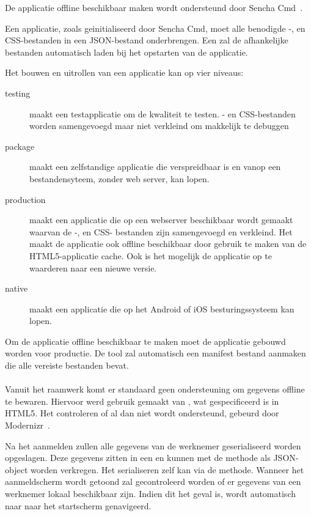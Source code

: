 De applicatie offline beschikbaar maken wordt ondersteund door Sencha Cmd~\cite{Sencha2012}.

Een applicatie,  zoals geinitialiseerd door Sencha Cmd,  moet alle benodigde \js-, en CSS-bestanden in een JSON-bestand onderbrengen.
Een  zal de afhankelijke bestanden automatisch laden bij het opstarten van de applicatie.

Het bouwen en uitrollen van een applicatie kan op vier niveaus:
\begin{description}
  \item [testing] maakt een testapplicatie om de kwaliteit te testen.  \js- en CSS-bestanden worden samengevoegd maar niet verkleind om makkelijk te debuggen
  \item [package] maakt een zelfstandige applicatie die verspreidbaar is en vanop een bestandensyteem,  zonder web server,  kan lopen.
  \item [production] maakt een applicatie die op een webserver beschikbaar wordt gemaakt waarvan de \js-, en CSS- bestanden zijn samengevoegd en verkleind.  Het maakt de applicatie ook offline beschikbaar door gebruik te maken van de HTML5-applicatie cache.  Ook is het mogelijk de applicatie op te waarderen naar een nieuwe versie.
  \item [native] maakt een  applicatie die op het Android of iOS besturingssysteem kan lopen.
\end{description}
Om de applicatie offline beschikbaar te maken moet de applicatie gebouwd worden voor productie.
De tool zal automatisch een manifest bestand aanmaken die alle vereiste bestanden bevat.

\paragraph{\kendo}
Vanuit het raamwerk komt er standaard geen ondersteuning om gegevens offline te bewaren.
Hiervoor werd gebruik gemaakt van , wat gespecificeerd is in HTML5.
Het controleren of  al dan niet wordt ondersteund, gebeurd door Modernizr~\cite{Modernizr2012}.

Na het aanmelden zullen alle gegevens van de werknemer geserialiseerd worden opgeslagen.
Deze gegevens zitten in een  en kunnen met de  methode als JSON-object worden verkregen.
Het serialiseren zelf kan via de  methode.
Wanneer het aanmeldscherm wordt getoond zal gecontroleerd worden of er gegevens van een werknemer lokaal beschikbaar zijn.
Indien dit het geval is, wordt automatisch naar naar het startscherm genavigeerd.

